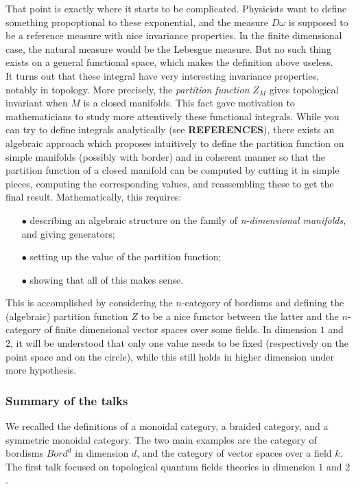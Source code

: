 That point is exactly where it starts to be complicated. Physicists want to define something propoptional to these exponential, and the measure $D\omega$ is supposed to be a reference measure with nice invariance properties. In the finite dimensional case, the natural measure would be the Lebesgue measure. But no such thing exists on a general functional space, which makes the definition above useless.\\  

It turns out that these integral have very interesting invariance properties, notably in topology. More precisely, the \textit{partition function} $Z_M$ gives topological invariant when $M$ is a closed manifolds. This fact gave motivation to mathematicians to study more attentively these functional integrals. While you can try to define integrals analytically (see \textbf{REFERENCES}), there exists an algebraic approach which proposes intuitively to define the partition function on simple manifolds (possibly with border) and in coherent manner so that the partition function of a closed manifold can be computed by cutting it in simple pieces, computing the corresponding values, and reassembling these to get the final result. Mathematically, this requires: 
\begin{itemize}
\item[$\bullet$] describing an algebraic structure on the family of \textit{n-dimensional manifolds}, and giving generators;
\item[$\bullet$] setting up the value of the partition function;
\item[$\bullet$] showing that all of this makes sense.
\end{itemize}
This is accomplished by considering the $n$-category of bordisms and defining the (algebraic) partition function $Z$ to be a nice functor between the latter and the $n$-category of finite dimensional vector spaces over some fields. In dimension $1$ and $2$, it will be understood that only one value needs to be fixed (respectively on the point space and on the circle), while this still holds in higher dimension under more hypothesis.

\subsubsection{Summary of the talks}

We recalled the definitions of a monoidal category, a braided category, and a symmetric monoidal category. The two main examples are the category of bordisms $Bord^d$ in dimension $d$, and the category of vector spaces over a field $k$. The first talk focused on topological quantum fields theories in dimension $1$ and $2$.

